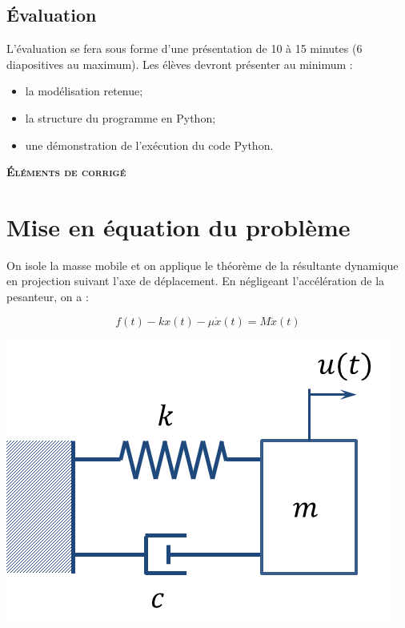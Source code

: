 \documentclass[10pt,fleqn]{article} %
\begin{document}
\begin{multicols}{2}
\section{Évaluation}
L'évaluation se fera sous forme d'une présentation de 10 à 15 minutes (6 diapositives au maximum). Les élèves devront présenter au minimum : 
\begin{itemize}
\item la modélisation retenue;
\item la structure du programme en Python;
\item une démonstration de l'exécution du code Python.
\end{itemize}


\end{multicols}

\ifprof
\newpage

\setcounter{section}{0}
\begin{center}
\textsc\textbf{{Éléments de corrigé}}
\end{center}

\section{Mise en équation du problème}

\begin{minipage}[c]{.77\linewidth}
On isole la masse mobile et on applique le théorème de la résultante dynamique en projection suivant l'axe de déplacement. En négligeant l'accélération de la pesanteur, on a :

\begin{equation}
f(t)-kx(t)-\mu\dot{x}(t) = M\ddot{x}(t) 
\end{equation}


\end{minipage} \hfill
\begin{minipage}[c]{.2\linewidth}
\includegraphics[width=\textwidth]{images/cellule}
\end{minipage}
\end{document}
